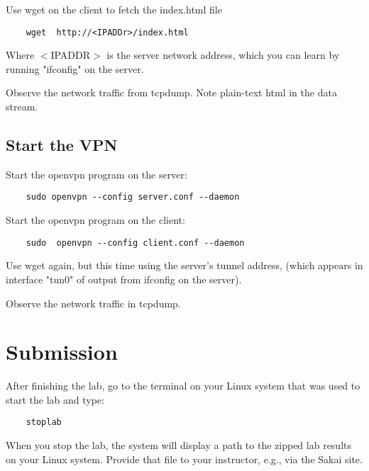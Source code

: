 Use wget on the client to fetch the index.html file
\begin{verbatim}
    wget  http://<IPADDr>/index.html
\end{verbatim}
Where $<$IPADDR$>$ is the server network address, which you
can learn by running "ifconfig" on the server.

Observe the network traffic from tcpdump.  Note plain-text
html in the data stream.

\subsection{Start the VPN}
Start the openvpn program on the server:
\begin{verbatim}
    sudo openvpn --config server.conf --daemon
\end{verbatim}

Start the openvpn program on the client:
\begin{verbatim}
    sudo  openvpn --config client.conf --daemon
\end{verbatim}

Use wget again, but this time using the server's
tunnel address, (which appears in interface "tun0"
of output from ifconfig on the server).

Observe the network traffic in tcpdump.

\section{Submission}
After finishing the lab, go to the terminal on your Linux system that was used to start the lab and type:
\begin{verbatim}
    stoplab 
\end{verbatim}
When you stop the lab, the system will display a path to the zipped lab results on your Linux system.  Provide that file to 
your instructor, e.g., via the Sakai site.

\copyrightnotice


